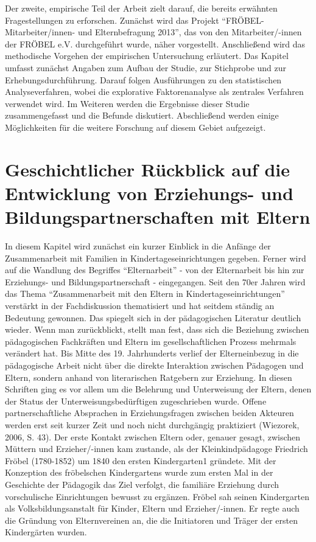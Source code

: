 \documentclass[12pt,a4paper]{article}
\begin{document}
	Der zweite, empirische Teil der Arbeit zielt darauf, die bereits erwähnten Fragestellungen zu erforschen. Zunächst wird das Projekt "`FRÖBEL-Mitarbeiter/innen- und Elternbefragung 2013"', das von den Mitarbeiter/-innen der FRÖBEL e.V. durchgeführt wurde, näher vorgestellt. Anschließend wird das methodische Vorgehen der empirischen Untersuchung erläutert. Das Kapitel umfasst zunächst Angaben zum Aufbau der Studie, zur Stichprobe und zur Erhebungsdurchführung. Darauf folgen Ausführungen zu den statistischen Analyseverfahren, wobei die explorative Faktorenanalyse als zentrales Verfahren verwendet wird. Im Weiteren werden die Ergebnisse dieser Studie zusammengefasst und die Befunde diskutiert. Abschließend werden einige Möglichkeiten für die weitere Forschung auf diesem Gebiet aufgezeigt.	

\section{Geschichtlicher Rückblick auf die Entwicklung von Erziehungs- und Bildungspartnerschaften mit Eltern}
In diesem Kapitel wird zunächst ein kurzer Einblick in die Anfänge der Zusammenarbeit mit Familien in Kindertageseinrichtungen gegeben. Ferner wird auf die Wandlung des Begriffes "`Elternarbeit"' -  von der Elternarbeit bis hin zur Erziehungs- und Bildungspartnerschaft - eingegangen.
	 Seit den 70er Jahren wird das Thema "`Zusammenarbeit mit den Eltern in  Kindertageseinrichtungen"' verstärkt in der Fachdiskussion thematisiert und hat seitdem ständig an Bedeutung gewonnen. Das spiegelt sich in der pädagogischen Literatur deutlich wieder. Wenn man zurückblickt, stellt man fest, dass sich die Beziehung zwischen pädagogischen Fachkräften und Eltern im gesellschaftlichen Prozess mehrmals verändert hat. Bis Mitte des 19. Jahrhunderts verlief der Elterneinbezug in die pädagogische Arbeit nicht über die direkte Interaktion zwischen Pädagogen und Eltern, sondern anhand von literarischen Ratgebern zur Erziehung. In diesen Schriften ging es vor allem um die Belehrung und Unterweisung der Eltern, denen der Status der Unterweisungsbedürftigen zugeschrieben wurde. Offene partnerschaftliche Absprachen in Erziehungsfragen zwischen beiden Akteuren werden erst seit kurzer Zeit und noch nicht durchgängig praktiziert (Wiezorek, 2006, S. 43).
	Der erste Kontakt zwischen Eltern oder, genauer gesagt, zwischen Müttern und Erzieher/-innen kam zustande, als der Kleinkindpädagoge Friedrich Fröbel (1780-1852) um 1840 den ersten Kindergarten1 gründete. Mit der Konzeption des fröbelschen Kindergartens wurde zum ersten Mal in der Geschichte der Pädagogik das Ziel verfolgt, die familiäre Erziehung durch vorschulische Einrichtungen bewusst zu ergänzen. Fröbel sah seinen Kindergarten als Volksbildungsanstalt für Kinder, Eltern und Erzieher/-innen. Er regte auch die Gründung von Elternvereinen an, die die Initiatoren und Träger der ersten Kindergärten wurden. 
\end{document}
